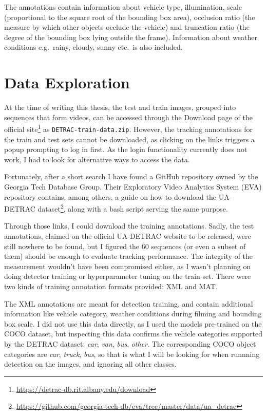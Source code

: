 The annotations contain information about vehicle type, illumination, scale (proportional to the square root of the bounding box area), occlusion ratio (the measure by which other objects occlude the vehicle) and truncation ratio (the degree of the bounding box lying outside the frame). Information about weather conditions e.g.~rainy, cloudy, sunny etc.~is also included.


\section{Data Exploration}

At the time of writing this thesis, the test and train images, grouped into sequences that form videos, can be accessed through the Download page of the official site\footnote{\url{https://detrac-db.rit.albany.edu/download}} as \verb|DETRAC-train-data.zip|. However, the tracking annotations for the train and test sets cannot be downloaded, as clicking on the links triggers a popup prompting to log in first. As the login functionality currently does not work, I had to look for alternative ways to access the data.  

Fortunately, after a short search I have found a GitHub repository owned by the Georgia Tech Database Group. Their Exploratory Video Analytics System (EVA) repository contains, among others, a guide on how to download the UA-DETRAC dataset\footnote{\url{https://github.com/georgia-tech-db/eva/tree/master/data/ua_detrac}}, along with a bash script serving the same purpose.

Through those links, I could download the training annotations. Sadly, the test annotations, claimed on the official UA-DETRAC website to be released, were still nowhere to be found, but I figured the 60 sequences (or even a subset of them) should be enough to evaluate tracking performance. The integrity of the measurement wouldn't have been compromised either, as I wasn't planning on doing detector training or hyperparameter tuning on the train set. There were two kinds of training annotation formats provided: XML and MAT.

The XML annotations are meant for detection training, and contain additional information like vehicle category, weather conditions during filming and bounding box scale. I did not use this data directly, as I used the models pre-trained on the COCO dataset, but inspecting this data confirms the vehicle categories supported by the DETRAC dataset: \textit{car}, \textit{van}, \textit{bus}, \textit{other}. The corresponding COCO object categories are \textit{car}, \textit{truck}, \textit{bus}, so that is what I will be looking for when runnning detection on the images, and ignoring all other classes.

